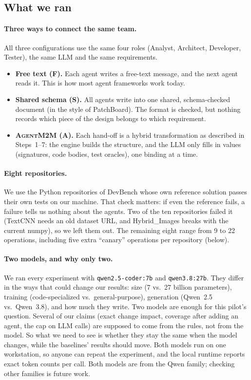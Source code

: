 \documentclass[10pt,a4paper]{article}
\newcommand{\tool}{\textsc{AgentM2M}}
\theoremstyle{definition}
\begin{document}
\subsection{What we ran}

\paragraph{Three ways to connect the same team.} All three configurations
use the same four roles (Analyst, Architect, Developer, Tester), the same
LLM and the same requirements.
\begin{itemize}[nosep]
\item \textbf{Free text (F).} Each agent writes a free-text message, and the
next agent reads it. This is how most agent frameworks work today.
\item \textbf{Shared schema (S).} All agents write into one shared,
schema-checked document (in the style of PatchBoard). The format is
checked, but nothing records which piece of the design belongs to which
requirement.
\item \textbf{\tool{} (A).} Each hand-off is a hybrid transformation as
described in Steps~1--7: the engine builds the structure, and the LLM only
fills in values (signatures, code bodies, test oracles), one binding at a
time.
\end{itemize}

\paragraph{Eight repositories.} We use the Python repositories of DevBench
whose own reference solution passes their own tests on our machine. That
check matters: if even the reference fails, a failure tells us nothing about
the agents. Two of the ten repositories failed it (TextCNN needs an old
dataset URL, and Hybrid\_Images breaks with the current numpy), so we left
them out. The remaining eight range from 9 to 22 operations, including five
extra ``canary'' operations per repository (below).

\paragraph{Two models, and why only two.} We ran every experiment with
\texttt{qwen2.5-coder:7b} and \texttt{qwen3.8:27b}. They differ in the ways
that could change our results: size (7 vs.\ 27 billion parameters),
training (code-specialized vs.\ general-purpose), generation (Qwen~2.5 vs.\
Qwen~3.8), and how much they write. Two models are enough for this pilot's
question. Several of our claims (exact change impact, coverage after adding
an agent, the cap on LLM calls) are supposed to come from the rules, not
from the model. So what we need to see is whether they stay the same when
the model changes, while the baselines' results should move. Both models
run on one workstation, so anyone can repeat the experiment, and the local
runtime reports exact token counts per call. Both models are from the Qwen
family; checking other families is future work.
\end{document}
